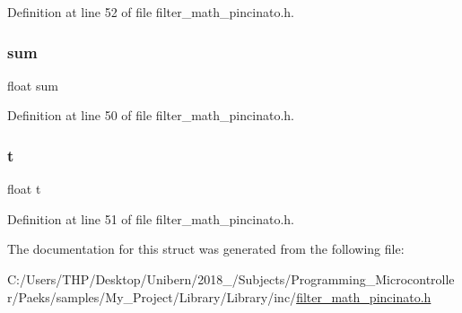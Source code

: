 Definition at line 52 of file filter\+\_\+math\+\_\+pincinato.\+h.

\mbox{\label{struct___integratal_data___aeeafe7e9eebbd2a45ce4fa2ae0d96c51}} 
\subsubsection{\texorpdfstring{sum}{sum}}
{\footnotesize\ttfamily float sum}



Definition at line 50 of file filter\+\_\+math\+\_\+pincinato.\+h.

\mbox{\label{struct___integratal_data___afea36502e9d227ff62c5fb2719a246f2}} 
\subsubsection{\texorpdfstring{t}{t}}
{\footnotesize\ttfamily float t}



Definition at line 51 of file filter\+\_\+math\+\_\+pincinato.\+h.



The documentation for this struct was generated from the following file\+:\begin{DoxyCompactItemize}
\item 
C\+:/\+Users/\+T\+H\+P/\+Desktop/\+Unibern/2018\+\_/\+Subjects/\+Programming\+\_\+\+Microcontroller/\+Paeks/samples/\+My\+\_\+\+Project/\+Library/\+Library/inc/\mbox{\hyperlink{filter__math__pincinato_8h}{filter\+\_\+math\+\_\+pincinato.\+h}}\end{DoxyCompactItemize}
